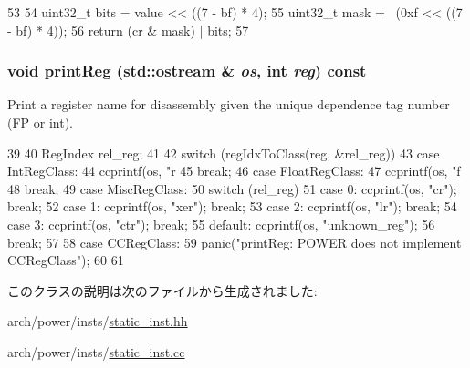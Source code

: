 \begin{DoxyCode}
53     {
54         uint32_t bits = value << ((7 - bf) * 4);
55         uint32_t mask = ~(0xf << ((7 - bf) * 4));
56         return (cr & mask) | bits;
57     }
\end{DoxyCode}
\hypertarget{classPowerISA_1_1PowerStaticInst_a48f52fc281b71e29aa8733caf36546fa}{
\subsubsection[{printReg}]{\setlength{\rightskip}{0pt plus 5cm}void printReg (std::ostream \& {\em os}, \/  int {\em reg}) const}}
\label{classPowerISA_1_1PowerStaticInst_a48f52fc281b71e29aa8733caf36546fa}
Print a register name for disassembly given the unique dependence tag number (FP or int). 


\begin{DoxyCode}
39 {
40     RegIndex rel_reg;
41 
42     switch (regIdxToClass(reg, &rel_reg)) {
43       case IntRegClass:
44         ccprintf(os, "r%
45         break;
46       case FloatRegClass:
47         ccprintf(os, "f%
48         break;
49       case MiscRegClass:
50         switch (rel_reg) {
51           case 0: ccprintf(os, "cr"); break;
52           case 1: ccprintf(os, "xer"); break;
53           case 2: ccprintf(os, "lr"); break;
54           case 3: ccprintf(os, "ctr"); break;
55           default: ccprintf(os, "unknown_reg");
56             break;
57         }
58       case CCRegClass:
59         panic("printReg: POWER does not implement CCRegClass\n");
60     }
61 }
\end{DoxyCode}


このクラスの説明は次のファイルから生成されました:\begin{DoxyCompactItemize}
\item 
arch/power/insts/\hyperlink{arch_2power_2insts_2static__inst_8hh}{static\_\-inst.hh}\item 
arch/power/insts/\hyperlink{arch_2power_2insts_2static__inst_8cc}{static\_\-inst.cc}\end{DoxyCompactItemize}
